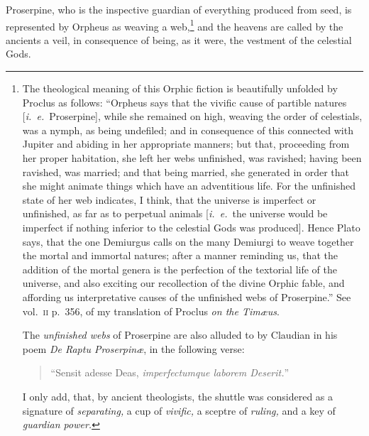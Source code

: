 \documentclass[12pt]{article}
\begin{document}
Proserpine, who is the inspective guardian of everything produced from seed, is
represented by Orpheus as weaving a web,\footnote{The theological meaning of
this Orphic fiction is beautifully unfolded by Proclus as follows: ``Orpheus
says that the vivific cause of partible natures [\textit{i.~e.}~Proserpine],
while she remained on high, weaving the order of celestials, was a nymph, as
being undefiled; and in consequence of this connected with Jupiter and abiding
in her appropriate manners; but that, proceeding from her proper habitation,
she left her webs unfinished, was ravished; having been ravished, was married;
and that being married, she generated in order that she might animate things
which have an adventitious life. For the unfinished state of her web indicates,
I think, that the universe is imperfect or unfinished, as far as to perpetual
animals [\textit{i.~e.}~the universe would be imperfect if nothing inferior to
the celestial Gods was produced]. Hence Plato says, that the one Demiurgus
calls on the many Demiurgi to weave together the mortal and immortal natures;
after a manner reminding us, that the addition of the mortal genera is the
perfection of the textorial life of the universe, and also exciting our
recollection of the divine Orphic fable, and affording us interpretative causes
of the unfinished webs of Proserpine.'' See vol.~\textsc{ii} p.~356, of my
translation of Proclus \textit{on the Tim{\ae}us}.

The \textit{unfinished webs} of Proserpine are also alluded to by Claudian in
his poem \textit{De Raptu Proserpin{\ae}}, in the following verse:

\begin{verse}
``Sensit adesse Deas, \textit{imperfectumque laborem Deserit.}''
\end{verse}

I only add, that, by ancient theologists, the shuttle was considered as a
signature of \textit{separating,} a cup of \textit{vivific,} a sceptre of
\textit{ruling,} and a key of \textit{guardian power.}} and the heavens are
called by the ancients a veil, in consequence of being, as it were, the
vestment of the celestial Gods.
\end{document}
